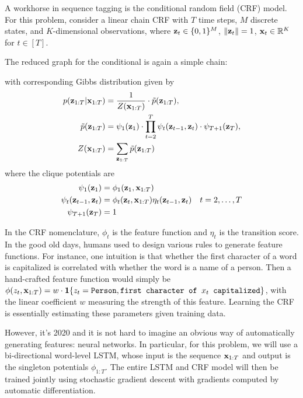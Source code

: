 \documentclass{article}
\begin{document}
A workhorse in sequence tagging is the conditional random field (CRF) model. 
For this problem, consider a linear chain CRF with $ T $ time steps, $ M $ discrete states, and $ K $-dimensional observations, where $ \mathbf{z}_t \in \{0,1\}^M $, $ \| \mathbf{z}_t \| = 1 $, $ \mathbf{x}_t \in \mathbb{R}^K $ for $ t \in [T] $.

The reduced graph for the conditional is again a simple chain: 
\begin{center}
\end{center}
with corresponding Gibbs distribution given by
\begin{align}
p(\mathbf{z}_{1:T} | \mathbf{x}_{1:T}) 
& = \frac{1}{Z(\mathbf{x}_{1:T})} \cdot \tilde{p}(\mathbf{z}_{1:T}), \\
\tilde{p}(\mathbf{z}_{1:T})
& = \psi_1 (\mathbf{z}_1) 
\cdot \prod_{t=2}^{T} \psi_t (\mathbf{z}_{t-1}, \mathbf{z}_t) 
\cdot \psi_{T+1} (\mathbf{z}_T), \\
Z(\mathbf{x}_{1:T})
& = \sum_{\mathbf{z}_{1:T}} \tilde{p}(\mathbf{z}_{1:T})
\end{align}
where the clique potentials are
\begin{align}
\psi_1 (\mathbf{z}_1) & = \phi_1 (\mathbf{z}_1, \mathbf{x}_{1:T}) \\
\psi_t (\mathbf{z}_{t-1}, \mathbf{z}_t) & = \phi_t (\mathbf{z}_t, \mathbf{x}_{1:T}) \eta_t (\mathbf{z}_{t-1}, \mathbf{z}_t)  \quad t = 2, \dotsc, T \\
\psi_{T+1} (\mathbf{z}_T) & = 1
\end{align}


In the CRF nomenclature, $ \phi_t $ is the feature function and $ \eta_t $ is the transition score. 
In the good old days, humans used to design various rules to generate feature functions.
For instance, one intuition is that whether the first character of a word is capitalized is correlated with whether the word is a name of a person.
Then a hand-crafted feature function would  simply be 
$ \phi (z_t, \mathbf{x}_{1:T}) = w \cdot \mathbf{1} \{z_t = \texttt{Person}, \texttt{first character of } x_t \texttt{ capitalized} \} $, with the linear coefficient $ w $ measuring the strength of this feature. 
Learning the CRF is essentially estimating these parameters given training data. 


However, it's 2020 and it is not hard to imagine an obvious way of automatically generating features: neural networks. 
In particular, for this problem, we will use a bi-directional word-level LSTM, whose input is the sequence $ \mathbf{x}_{1:T} $ and output is the singleton potentials $ \phi_{1:T} $. 
The entire LSTM and CRF model will then be trained jointly using stochastic gradient descent with gradients computed by automatic differentiation. 
\end{document}
